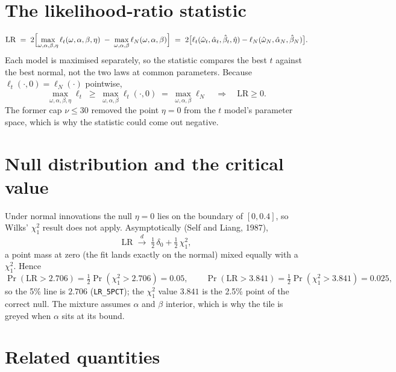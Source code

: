 \documentclass[11pt]{article}
\begin{document}
\section*{The likelihood-ratio statistic}

\begin{equation}
  \mathrm{LR} \;=\; 2\Bigl[\max_{\omega,\alpha,\beta,\eta}\ell_t(\omega,\alpha,\beta,\eta)
                      \;-\; \max_{\omega,\alpha,\beta}\ell_N(\omega,\alpha,\beta)\Bigr]
  \;=\; 2\bigl[\ell_t(\hat\omega_t,\hat\alpha_t,\hat\beta_t,\hat\eta) - \ell_N(\hat\omega_N,\hat\alpha_N,\hat\beta_N)\bigr].
\end{equation}
Each model is maximised separately, so the statistic compares the best $t$ against the best normal, not the two laws at common parameters. Because $\ell_t(\cdot,0) = \ell_N(\cdot)$ pointwise,
\begin{equation}
  \max_{\omega,\alpha,\beta,\eta}\ell_t \;\ge\; \max_{\omega,\alpha,\beta}\ell_t(\cdot,0) \;=\; \max_{\omega,\alpha,\beta}\ell_N
  \quad\Longrightarrow\quad \mathrm{LR} \ge 0 .
\end{equation}
The former cap $\nu \le 30$ removed the point $\eta = 0$ from the $t$ model's parameter space, which is why the statistic could come out negative.

\section*{Null distribution and the critical value}

Under normal innovations the null $\eta = 0$ lies on the boundary of $[0, 0.4]$, so Wilks' $\chi^2_1$ result does not apply. Asymptotically (Self and Liang, 1987),
\begin{equation}
  \mathrm{LR} \;\xrightarrow{d}\; \tfrac12\,\delta_0 + \tfrac12\,\chi^2_1 ,
\end{equation}
a point mass at zero (the fit lands exactly on the normal) mixed equally with a $\chi^2_1$. Hence
\begin{equation}
  \Pr(\mathrm{LR} > 2.706) = \tfrac12\Pr(\chi^2_1 > 2.706) = 0.05, \qquad
  \Pr(\mathrm{LR} > 3.841) = \tfrac12\Pr(\chi^2_1 > 3.841) = 0.025 ,
\end{equation}
so the 5\% line is $2.706$ (\texttt{LR\_5PCT}); the $\chi^2_1$ value $3.841$ is the 2.5\% point of the correct null. The mixture assumes $\alpha$ and $\beta$ interior, which is why the tile is greyed when $\alpha$ sits at its bound.

\section*{Related quantities}
\end{document}
